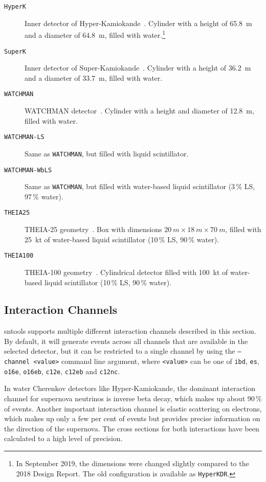 \documentclass[11pt, oneside]{article}
\begin{document}
\begin{description}
\item[\texttt{HyperK}] Inner detector of Hyper-Kamiokande~\cite{HKDR2018}. Cylinder with a height of \SI{65.8}{m} and a diameter of \SI{64.8}{m}, filled with water.\footnote{In September 2019, the dimensions were changed slightly compared to the 2018 Design Report. The old configuration is available as \texttt{HyperKDR}.}
\item[\texttt{SuperK}] Inner detector of Super-Kamiokande~\cite{Fukuda2003}. Cylinder with a height of \SI{36.2}{m} and a diameter of \SI{33.7}{m}, filled with water.
\item[\texttt{WATCHMAN}] WATCHMAN detector~\cite{Askins2015}. Cylinder with a height and diameter of \SI{12.8}{m}, filled with water.
\item[\texttt{WATCHMAN-LS}] Same as \texttt{WATCHMAN}, but filled with liquid scintillator.
\item[\texttt{WATCHMAN-WbLS}] Same as \texttt{WATCHMAN}, but filled with water-based liquid scintillator (3\,\% LS, 97\,\% water).
\item[\texttt{THEIA25}] THEIA-25 geometry~\cite{Askins2020}. Box with dimensions $\SI{20}{m}\times\SI{18}{m}\times\SI{70}{m}$, filled with \SI{25}{kt} of water-based liquid scintillator (10\,\% LS, 90\,\% water).
\item[\texttt{THEIA100}] THEIA-100 geometry~\cite{Askins2020}. Cylindrical detector filled with \SI{100}{kt} of water-based liquid scintillator (10\,\% LS, 90\,\% water).
\end{description}


\subsection{Interaction Channels} \label{sec:interaction-channels}
sntools supports multiple different interaction channels described in this section.
By default, it will generate events across all channels that are available in the selected detector, but it can be restricted to a single channel by using the \texttt{--channel <value>} command line argument, where \texttt{<value>} can be one of \texttt{ibd}, \texttt{es}, \texttt{o16e}, \texttt{o16eb}, \texttt{c12e}, \texttt{c12eb} and \texttt{c12nc}.

In water Cherenkov detectors like Hyper-Kamiokande, the dominant interaction channel for supernova neutrinos is inverse beta decay, which makes up about 90\,\% of events.
Another important interaction channel is elastic scattering on electrons, which makes up only a few per cent of events but provides precise information on the direction of the supernova.
The cross sections for both interactions have been calculated to a high level of precision.
\end{document}
